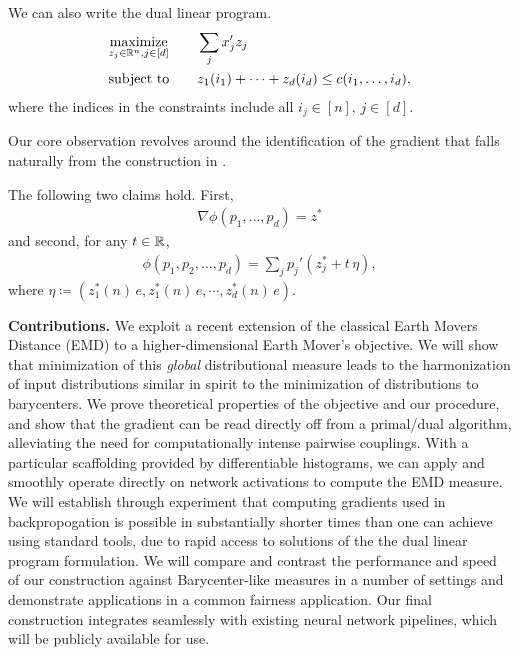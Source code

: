 We can also write the dual linear program.
\begin{alignat}{2}\label{eq:dualgeneralemd}\begin{split}
&\underset{z_j\in\mathbb{R}^n, j\in[d]}{\textrm{maximize}}\qquad\sum_{j} x_j'z_j\\
&\textrm{subject to}\qquad z_{1}(i_1)+\cdots+z_{d}(i_{d})\leq c(i_1,\ldots,i_{d}),\end{split}
\end{alignat}
where the indices in the constraints include all $i_j\in[n]$, $j\in[d]$.

Our core observation revolves around the identification of the gradient that falls naturally from the construction in \citep{kline2019properties}.
\begin{theorem}
	The following two claims hold. First,
	\begin{align*}
	\nabla \phi(p_1,\ldots,p_{d}) = z^*
	\end{align*}
	and second, for any $t\in \mathbb{R}$,
	\begin{align*}
	\phi(p_1,p_2,\ldots,p_{d}) = \sum_{j}p_j'
	(z_j^* + t\, \eta),
	\end{align*}
	where $\eta\coloneqq (z_1^{*}(n)\,e, z^*_1(n)\,e, \cdots, z^*_{d}(n)\,e)$.
	\label{thm:dualgrad}
\end{theorem}


\noindent\textbf{Contributions.} We exploit a recent extension of the classical Earth Movers Distance (EMD) to a higher-dimensional Earth Mover's objective.
We will show that minimization of this \textit{global} distributional measure leads to the 
harmonization of input distributions similar in spirit to the minimization of distributions to barycenters.
We prove theoretical properties of the objective and our procedure, and show that 
the gradient can be read directly off from a primal/dual algorithm,
alleviating the need for computationally intense pairwise couplings.
With a particular scaffolding provided by differentiable histograms, we can apply and smoothly operate directly on network activations to compute the EMD measure. 
We will establish through experiment that computing gradients used in backpropogation is possible in substantially shorter times than one can achieve using standard tools, due to rapid access to solutions of the the dual linear program formulation.
We will compare and contrast the performance and speed of our construction against Barycenter-like measures in a number of settings and demonstrate applications in a common fairness application.
Our final construction integrates seamlessly with existing neural network pipelines, 
which will be publicly available for use.


